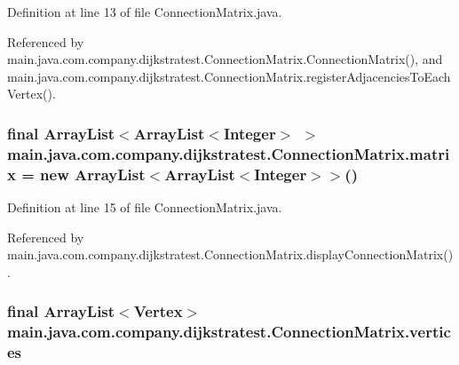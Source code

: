 Definition at line 13 of file Connection\-Matrix.\-java.



Referenced by main.\-java.\-com.\-company.\-dijkstratest.\-Connection\-Matrix.\-Connection\-Matrix(), and main.\-java.\-com.\-company.\-dijkstratest.\-Connection\-Matrix.\-register\-Adjacencies\-To\-Each\-Vertex().

\hypertarget{classmain_1_1java_1_1com_1_1company_1_1dijkstratest_1_1_connection_matrix_a3c077791f0b8164d8c19f67d250f43fd}{
\subsubsection[{matrix}]{\setlength{\rightskip}{0pt plus 5cm}final Array\-List$<$Array\-List$<$Integer$>$ $>$ main.\-java.\-com.\-company.\-dijkstratest.\-Connection\-Matrix.\-matrix = new Array\-List$<$Array\-List$<$Integer$>$$>$()\hspace{0.3cm}{\ttfamily [private]}}}\label{classmain_1_1java_1_1com_1_1company_1_1dijkstratest_1_1_connection_matrix_a3c077791f0b8164d8c19f67d250f43fd}


Definition at line 15 of file Connection\-Matrix.\-java.



Referenced by main.\-java.\-com.\-company.\-dijkstratest.\-Connection\-Matrix.\-display\-Connection\-Matrix().

\hypertarget{classmain_1_1java_1_1com_1_1company_1_1dijkstratest_1_1_connection_matrix_a372aa9baecc703f490a3eef8845bc7a7}{
\subsubsection[{vertices}]{\setlength{\rightskip}{0pt plus 5cm}final Array\-List$<${\bf Vertex}$>$ main.\-java.\-com.\-company.\-dijkstratest.\-Connection\-Matrix.\-vertices\hspace{0.3cm}{\ttfamily [private]}}}\label{classmain_1_1java_1_1com_1_1company_1_1dijkstratest_1_1_connection_matrix_a372aa9baecc703f490a3eef8845bc7a7}


